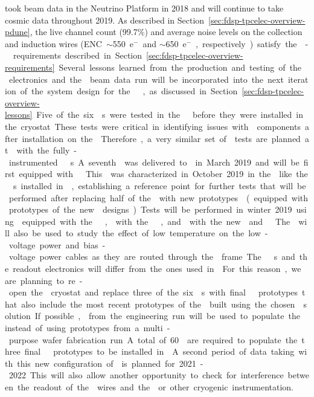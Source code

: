  took beam data in the  Neutrino Platform in 2018 and will continue
to take cosmic data throughout 2019. As described in Section~\ref{sec:fdsp-tpcelec-overview-pdune},
the live channel count (99.7\%) and average noise levels on the collection and induction wires 
(ENC~$\sim$\SI{550}{e$^-$} and $\sim$\SI{650}{e$^-$}, respectively) satisfy the - requirements described 
in Section~\ref{sec:fdsp-tpcelec-overview-requirements}. Several lessons learned from the production 
and testing of the  electronics and the  beam data run will be incorporated into the 
next iteration of the system design for the  , as discussed in 
Section~\ref{sec:fdsp-tpcelec-overview-lessons}.

Five of the six s were tested in the  \coldbox
before they were installed in the cryostat. These tests were critical
in identifying issues with  components after installation
on the . Therefore, a very similar set of \coldbox tests are planned at  
with the fully-instrumented  s. A seventh  was delivered
to  in March 2019 and will be first equipped with  . This
 was characterized in October 2019 in the \coldbox like the s installed
in , establishing a reference point for further tests that will be
performed after replacing half of the  with new prototypes  (equipped with prototypes of the
new  designs). Tests will be performed in 
winter 2019 using  equipped with the  , 
with the  , and  with the new  and
 . The \coldbox will also be used to study the effect of
low temperature on the low-voltage power and bias-voltage power cables as they are 
routed through the  frame.

The  s and the readout electronics will differ from the ones used 
in . For this reason, we are planning to re-open the  cryostat 
and replace three of the six s with final   prototypes that also include 
the most recent prototypes of the  built using the chosen  solution.
If possible,  from the engineering 
run will be used to populate the  instead of using prototypes from a multi-purpose
wafer fabrication run. A total of \num{60}  are required to populate the three 
final   prototypes to be installed in . A second period of data taking 
with this new configuration of  is planned for 2021-2022. This will also 
allow another opportunity to check for interference between the readout of the  
wires and the  or other cryogenic instrumentation. 

